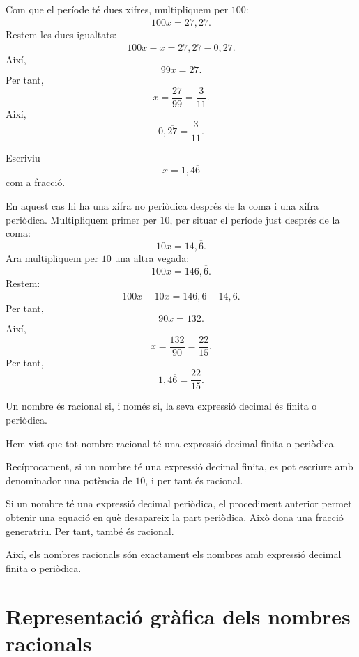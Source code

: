 \begin{solucio}
Com que el període té dues xifres, multipliquem per \(100\):
\[
	100x=27{,}\overline{27}.
\]
Restem les dues igualtats:
\[
	100x-x
	=
	27{,}\overline{27}-0{,}\overline{27}.
\]
Així,
\[
	99x=27.
\]
Per tant,
\[
	x=\frac{27}{99}=\frac{3}{11}.
\]
Així,
\[
	0{,}\overline{27}=\frac{3}{11}.
\]
\end{solucio}

\begin{exemple}
Escriviu
\[
	x=1{,}4\overline{6}
\]
com a fracció.
\end{exemple}

\begin{solucio}
En aquest cas hi ha una xifra no periòdica després de la coma i una xifra periòdica. Multipliquem primer per \(10\), per situar el període just després de la coma:
\[
	10x=14{,}\overline{6}.
\]
Ara multipliquem per \(10\) una altra vegada:
\[
	100x=146{,}\overline{6}.
\]
Restem:
\[
	100x-10x
	=
	146{,}\overline{6}-14{,}\overline{6}.
\]
Per tant,
\[
	90x=132.
\]
Així,
\[
	x=\frac{132}{90}=\frac{22}{15}.
\]
Per tant,
\[
	1{,}4\overline{6}=\frac{22}{15}.
\]
\end{solucio}

\begin{proposicio}
Un nombre és racional si, i només si, la seva expressió decimal és finita o periòdica.
\end{proposicio}

\begin{prova}
Hem vist que tot nombre racional té una expressió decimal finita o periòdica.

Recíprocament, si un nombre té una expressió decimal finita, es pot escriure amb denominador una potència de \(10\), i per tant és racional.

Si un nombre té una expressió decimal periòdica, el procediment anterior permet obtenir una equació en què desapareix la part periòdica. Això dona una fracció generatriu. Per tant, també és racional.

Així, els nombres racionals són exactament els nombres amb expressió decimal finita o periòdica.
\end{prova}

\section{Representació gràfica dels nombres racionals}

